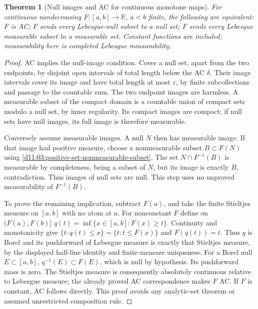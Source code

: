 \documentclass[11pt,oneside,openany]{book}
\newtheorem{theorem}{Theorem}[chapter]
\theoremstyle{definition}
\theoremstyle{remark}
\newcommand{\R}{\mathbb R}\newcommand{\C}{\mathbb C}
\newcommand{\eps}{\varepsilon}\newcommand{\ee}{\varepsilon}
\newcommand{\family}[1]{}
\begin{document}
\begin{theorem}[Null images and AC for continuous monotone maps]\family{D11.12.monotone_null_image_characterization}\label{d11:12:monotone-null-image-characterization}
For continuous nondecreasing $F:[a,b]\to\R$, $a<b$ finite, the following
are equivalent: $F$ is AC; $F$ sends every Lebesgue-null subset to a null
set; $F$ sends every Lebesgue measurable subset to a measurable set.
Constant functions are included; measurability here is completed Lebesgue
measurability.
\end{theorem}
\begin{proof}
AC implies the null-image condition. Cover a null set, apart from the
two endpoints, by disjoint open intervals of total length below the AC
$\delta$. Their image intervals cover its image and have total length
at most $\eps$, by finite subcollections and passage to the countable
sum. The two endpoint images are harmless. A measurable subset of the
compact domain is a countable union of compact sets modulo a null set,
by inner regularity. Its compact images are compact; if null sets have
null images, its full image is therefore measurable.

Conversely assume measurable images. A null $N$ then has measurable
image. If that image had positive measure, choose a nonmeasurable subset
$B\subset F(N)$ using \cref{d11:03:positive-set-nonmeasurable-subset}.
The set $N\cap F^{-1}(B)$ is measurable by completeness, being a subset
of $N$, but its image is exactly $B$, contradiction. Thus images of null
sets are null. This step uses no unproved measurability of $F^{-1}(B)$.

To prove the remaining implication, subtract $F(a)$, and take the finite
Stieltjes measure on $[a,b]$ with no atom at $a$. For nonconstant $F$
define on $(F(a),F(b)]$
$q(t)=\inf\{x\in[a,b]:F(x)\geq t\}$. Continuity and monotonicity give
$\{t:q(t)\leq x\}=\{t:t\leq F(x)\}$ and $F(q(t))=t$.
Thus $q$ is Borel and its pushforward of Lebesgue measure is exactly that
Stieltjes measure, by the displayed half-line identity and finite-measure
uniqueness. For a Borel null $E\subset[a,b]$,
$q^{-1}(E)\subset F(E)$, which is null by hypothesis. Its pushforward
mass is zero. The Stieltjes measure is consequently absolutely continuous
relative to Lebesgue measure; the already proved AC correspondence makes
$F$ AC. If $F$ is constant, AC follows directly. This proof avoids any
analytic-set theorem or assumed unrestricted composition rule.
\end{proof}
\end{document}
